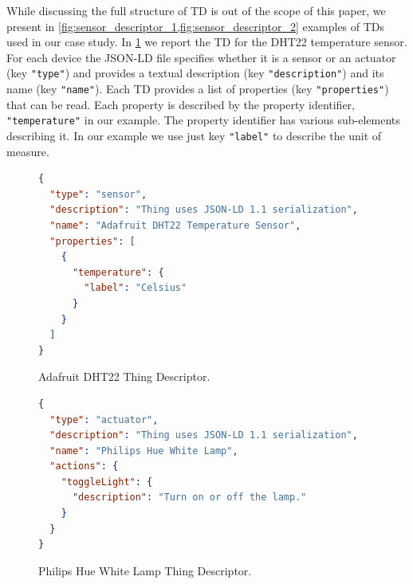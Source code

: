 While discussing the full structure of TD is out of the scope of this
paper, we present in \cref{fig:sensor_descriptor_1,fig:sensor_descriptor_2} examples of TDs used in our
case study. In \cref{fig:sensor_descriptor_1} we report the TD
for the DHT22 temperature sensor. For each device the JSON-LD file
specifies whether it is a sensor or an actuator (key \lstinline|"type"|) and
provides a textual description (key \lstinline|"description"|) and its name
(key \lstinline|"name"|). Each TD provides a list of
properties (key \lstinline|"properties"|) that can be read. Each property is
described by the property identifier, \lstinline{"temperature"} in our
example. The property identifier has various sub-elements describing it. In
our example we use just key \lstinline{"label"} to describe the unit of
measure.


\begin{figure}[b]
  \centering
  \begin{lstlisting}[language=json]
{
  "type": "sensor",
  "description": "Thing uses JSON-LD 1.1 serialization",
  "name": "Adafruit DHT22 Temperature Sensor",
  "properties": [
    {
      "temperature": {
        "label": "Celsius"
      }
    }
  ]
}
\end{lstlisting}
\caption{Adafruit DHT22 Thing Descriptor.}
  \label{fig:sensor_descriptor_1}
\end{figure}


\begin{figure}[tb]
\centering
\begin{lstlisting}[language=json]
{
  "type": "actuator",
  "description": "Thing uses JSON-LD 1.1 serialization",
  "name": "Philips Hue White Lamp",
  "actions": {
    "toggleLight": {
      "description": "Turn on or off the lamp."
    }
  }
}
\end{lstlisting}
  \caption{Philips Hue White Lamp Thing Descriptor.}
  \label{fig:sensor_descriptor_2}
\end{figure}


